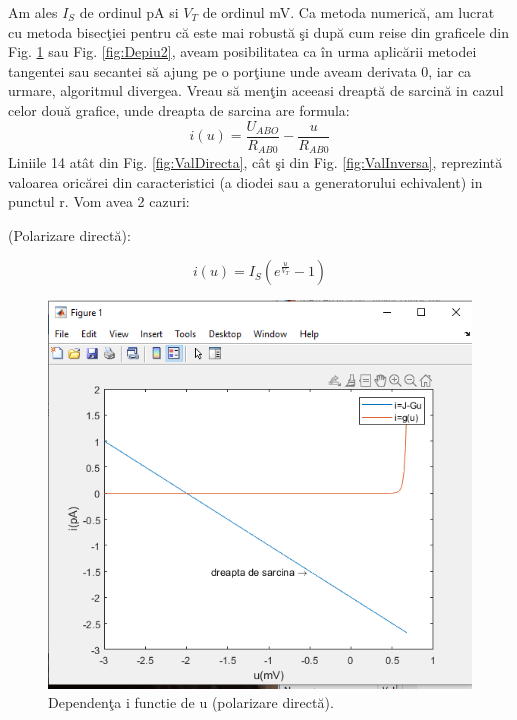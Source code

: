 \documentclass[multi=false, tikz, border=2mm]{article}
\newcommand\tab[1][0.6cm]{\hspace*{#1}}
\begin{document}
	\tab Am ales $I_{S}$ de ordinul pA si $V_{T}$ de ordinul mV.	
	Ca metoda numeric\u{a}, am lucrat cu metoda bisec\c{t}iei pentru c\u{a} este mai robust\u{a} \c{s}i dup\u{a} cum reise din graficele din Fig. \ref{fig:Depiu1} sau Fig. \ref{fig:Depiu2}, aveam posibilitatea ca \^{i}n urma aplic\u{a}rii metodei tangentei sau secantei s\u{a} ajung pe o por\c{t}iune unde aveam derivata 0, iar ca urmare, algoritmul divergea.
	Vreau s\u{a} men\c{t}in aceeasi dreapt\u{a} de sarcin\u{a} in cazul celor dou\u{a} grafice, unde dreapta de sarcina are formula: 
	\begin{equation} \label{eq:ecTaieturi}
	i(u) = \frac{U_{ABO}}{R_{AB0}}-\frac{u}{R_{AB0}}
	\end{equation}
	Liniile 14 at\^{a}t din Fig. \ref{fig:ValDirecta}, c\^{a}t \c{s}i din Fig. \ref{fig:ValInversa}, reprezint\u{a} valoarea oric\u{a}rei din caracteristici (a diodei sau a generatorului echivalent) in punctul r.
	Vom avea 2 cazuri:
	
	{\color{orange}{\bf Cazul 1}} (Polarizare direct\u{a}):
	
	\begin{equation} \label{eq:ecPolDir}
	i(u) = I_{S}(e^{\frac{u}{V_{T}}}-1)
	\end{equation}
	
	
	\begin{figure}[H]
	\hspace{1.7cm}
	\includegraphics[trim = 20 0 23 70, clip, scale=0.6]{PolarizareDirecta}
	\caption{Dependen\c{t}a i functie de u (polarizare direct\u{a}).}\label{fig:Depiu1}
	\end{figure}
	
\end{document}
